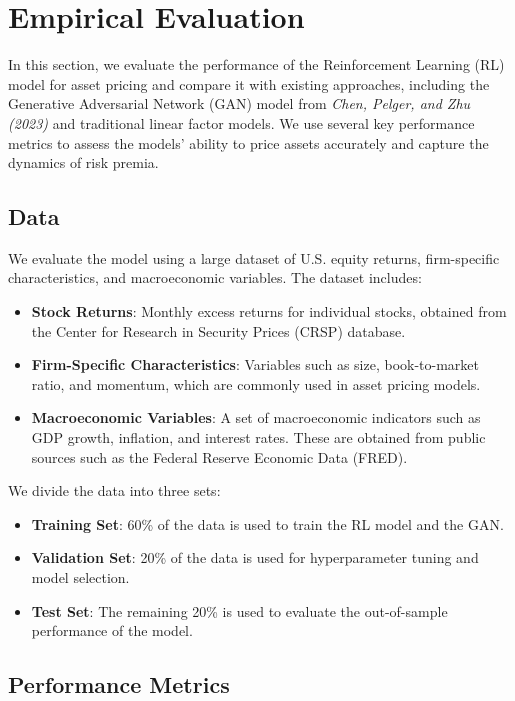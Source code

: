 \section{Empirical Evaluation}

In this section, we evaluate the performance of the Reinforcement Learning (RL) model for asset pricing and compare it with existing approaches, including the Generative Adversarial Network (GAN) model from \textit{Chen, Pelger, and Zhu (2023)} and traditional linear factor models. We use several key performance metrics to assess the models' ability to price assets accurately and capture the dynamics of risk premia.

\subsection{Data}

We evaluate the model using a large dataset of U.S. equity returns, firm-specific characteristics, and macroeconomic variables. The dataset includes:
\begin{itemize}
    \item \textbf{Stock Returns}: Monthly excess returns for individual stocks, obtained from the Center for Research in Security Prices (CRSP) database. 
    \item \textbf{Firm-Specific Characteristics}: Variables such as size, book-to-market ratio, and momentum, which are commonly used in asset pricing models.
    \item \textbf{Macroeconomic Variables}: A set of macroeconomic indicators such as GDP growth, inflation, and interest rates. These are obtained from public sources such as the Federal Reserve Economic Data (FRED).
\end{itemize}

We divide the data into three sets:
\begin{itemize}
    \item \textbf{Training Set}: 60\% of the data is used to train the RL model and the GAN.
    \item \textbf{Validation Set}: 20\% of the data is used for hyperparameter tuning and model selection.
    \item \textbf{Test Set}: The remaining 20\% is used to evaluate the out-of-sample performance of the model.
\end{itemize}

\subsection{Performance Metrics}


